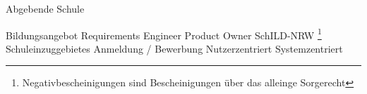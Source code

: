 Abgebende Schule

Bildungsangebot
Requirements Engineer
Product Owner
SchILD-NRW
\footnote{Negativbescheinigungen sind Bescheinigungen über das alleinge Sorgerecht}
Schuleinzuggebietes
Anmeldung / Bewerbung
Nutzerzentriert
Systemzentriert